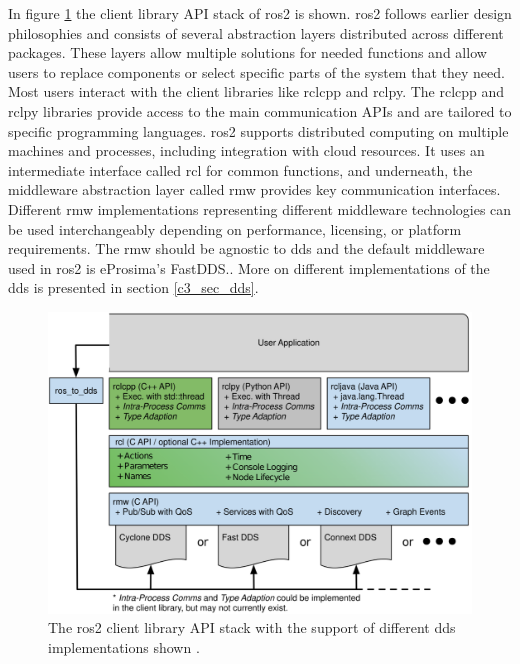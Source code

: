 In figure \ref{c3_fig_ros2_stack} the client library API stack of \gls{ros2} is shown. \gls{ros2} follows earlier design philosophies and consists of several abstraction layers distributed across different packages. These layers allow multiple solutions for needed functions and allow users to replace components or select specific parts of the system that they need. Most users interact with the client libraries like \gls{rclcpp} and \gls{rclpy}. The \gls{rclcpp} and \gls{rclpy} libraries provide access to the main communication APIs and are tailored to specific programming languages. \gls{ros2} supports distributed computing on multiple machines and processes, including integration with cloud resources. It uses an intermediate interface called \gls{rcl} for common functions, and underneath, the middleware abstraction layer called \gls{rmw} provides key communication interfaces. Different \gls{rmw} implementations representing different middleware technologies can be used interchangeably depending on performance, licensing, or platform requirements\cite{rico_concise_2022, macenski_robot_2022, liao_introduction_2020}. \newline
The \gls{rmw} should be agnostic to \gls{dds} and the default middleware used in \gls{ros2} is eProsima's FastDDS.\cite{macenski_robot_2022, noauthor_ros_nodate-1, noauthor_eprosima_nodate}. More on different implementations of the \gls{dds} is presented in section \ref{c3_sec_dds}.
\begin{figure}[htbp]
	\centering
	\includegraphics[width=1\textwidth]{Figures/c3/ros2_client_library_stack.png}
	\caption{The \gls{ros2} client library API stack with the support of different \gls{dds} implementations shown \cite{macenski_robot_2022}.}
	\label{c3_fig_ros2_stack}
\end{figure}

